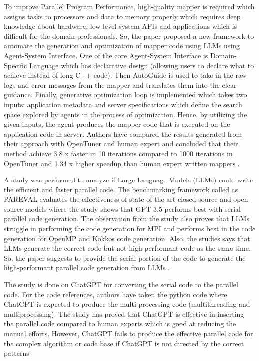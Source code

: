 \documentclass[conference]{IEEEtran}
\begin{document}
To improve Parallel Program Performance, high-quality mapper is required which assigns tasks to processors and data to memory properly which requires deep knowledge about hardware, low-level system APIs and applications which is difficult for the domain professionals. So, the paper \cite{wei2024improving} proposed a new framework to automate the generation and optimization of mapper code using LLMs using Agent-System Interface. One of the core Agent-System Interface is Domain-Specific Language which has declarative design (allowing users to declare what to achieve instead of long C++ code). Then AutoGuide is used to take in the raw logs and error messages from the mapper and translates them into the clear guidance. Finally, generative optimization loop is implemented which takes two inputs: application metadata and server specifications which define the search space explored by agents in the process of optimization. Hence, by utilizing the given inputs, the agent produces the mapper code that is executed on the application code in server. Authors have compared the results generated from their approach with OpenTuner and human expert and concluded that their method achieve 3.8 x faster in 10 iterations compared to 1000 iterations in OpenTuner and 1.34 x higher speedup than human expert written mappers \cite{wei2024improving}. 

A study was performed to analyze if Large Language Models (LLMs) could write the efficient and faster parallel code. The benchmarking framework called as PAREVAL \cite{nichols2024can} evaluates the effectiveness of state-of-the-art closed-source and open-source models where the study shows that GPT-3.5 performs best with serial parallel code generation. The observation from the study also proves that LLMs struggle in performing the code generation for MPI and performs best in the code generation for OpenMP and Kokkos code generation. Also, the studies says that LLMs generate the correct code but not high-performant code as the same time. So, the paper suggests to provide the serial portion of the code to generate the high-performant parallel code generation from LLMs \cite{nichols2024can}. 

The study is done on ChatGPT for converting the serial code to the parallel code. For the code references, authors have taken the python code where ChatGPT is expected to produce the multi-processing code (multithreading and multiprocessing). The study has proved that ChatGPT is effective in inserting the parallel code compared to human experts which is good at reducing the manual efforts. However, ChatGPT fails to produce the effective parallel code for the complex algorithm or code base if ChatGPT is not directed by the correct patterns \cite{10.1007/978-3-031-92734-8_5}
\end{document}
